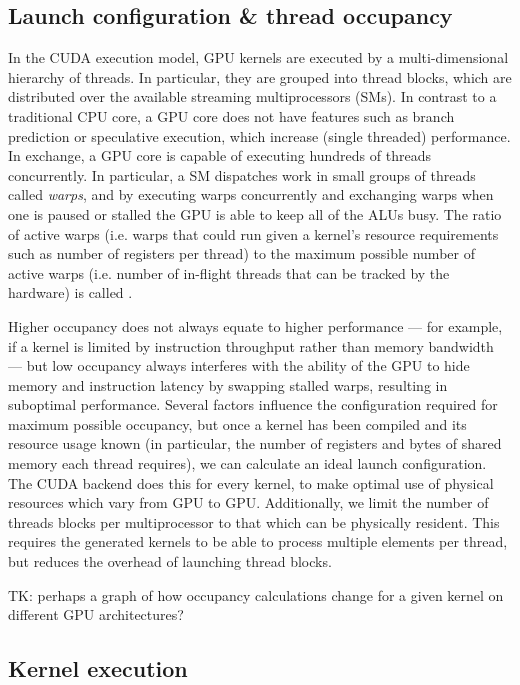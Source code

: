 \subsection{Launch configuration \& thread occupancy}

In the CUDA execution model, GPU kernels are executed by a multi-dimensional
hierarchy of threads. In particular, they are grouped into thread blocks, which
are distributed over the available streaming multiprocessors (SMs). In contrast
to a traditional CPU core, a GPU core does not have features such as branch
prediction or speculative execution, which increase (single threaded)
performance. In exchange, a GPU core is capable of executing hundreds of threads
concurrently. In particular, a SM dispatches work in small groups of threads
called \emph{warps}, and by executing warps concurrently and
exchanging warps when one is paused or stalled the GPU is able to keep all of
the ALUs busy. The ratio of active warps (i.e. warps that could run given a
kernel's resource requirements such as number of registers per thread) to the
maximum possible number of active warps (i.e. number of in-flight threads that
can be tracked by the hardware) is called .

Higher occupancy does not always equate to higher performance --- for example,
if a kernel is limited by instruction throughput rather than memory bandwidth
--- but low occupancy always interferes with the ability of the GPU to hide
memory and instruction latency by swapping stalled warps, resulting in
suboptimal performance. Several factors influence the configuration required for
maximum possible occupancy, but once a kernel has been compiled and its resource
usage known (in particular, the number of registers and bytes of shared memory
each thread requires), we can calculate an ideal launch configuration. The CUDA
backend does this for every kernel, to make optimal use of physical resources
which vary from GPU to GPU\@. Additionally, we limit the number of threads blocks
per multiprocessor to that which can be physically resident. This requires the
generated kernels to be able to process multiple elements per thread, but
reduces the overhead of launching thread blocks.

TK: perhaps a graph of how occupancy calculations change for a given kernel on different GPU architectures?


\subsection{Kernel execution}

